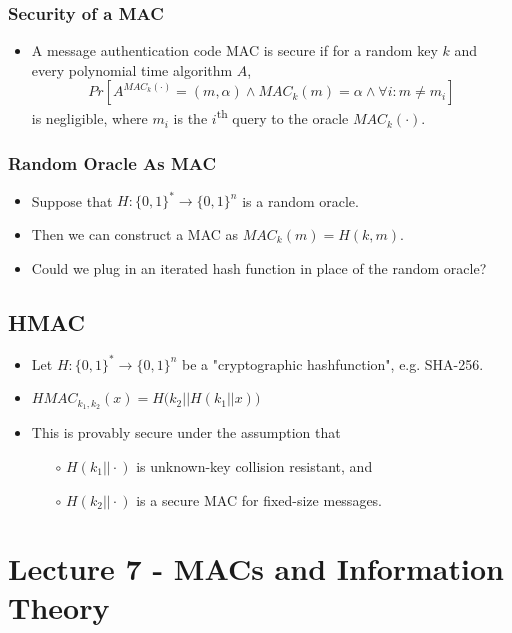 \documentclass[a4paper]{scrartcl}
\newcommand{\ts}{\textsuperscript}
\begin{document}
\subsubsection*{Security of a MAC}
\begin{itemize}
\item A message authentication code MAC is secure if for a random key $k$ and every polynomial time algorithm $A$,
$$Pr[A^{MAC_k(\cdot)}=(m,\alpha) \land MAC_k(m) = \alpha \land \forall i : m \neq m_i]$$
is negligible, where $m_i$ is the $i$\ts{th} query to the oracle $MAC_k(\cdot)$.
\end{itemize}

\subsubsection*{Random Oracle As MAC}

\begin{itemize}
\item Suppose that $H: \{0,1\}^* \rightarrow \{0,1\}^n$ is a random oracle.
\item Then we can construct a MAC as $MAC_k(m) = H(k,m)$.
\item Could we plug in an iterated hash function in place of the random oracle?
\end{itemize}

\subsection*{HMAC}

\begin{itemize}
\item Let $H: \{0,1\}^* \rightarrow \{0,1\}^n$ be a "cryptographic hashfunction", e.g. SHA-256.
\item $HMAC_{k_1, k_2}(x) = H\big(k_2||H(k_1||x)\big)$
\item This is provably secure under the assumption that
\begin{itemize}
\item [$\circ$] $H(k_1||\cdot)$ is unknown-key collision resistant, and
\item [$\circ$] $H(k_2||\cdot)$ is a secure MAC for fixed-size messages.
\end{itemize}
\end{itemize}

\section*{Lecture 7 - MACs and Information Theory}
\end{document}
